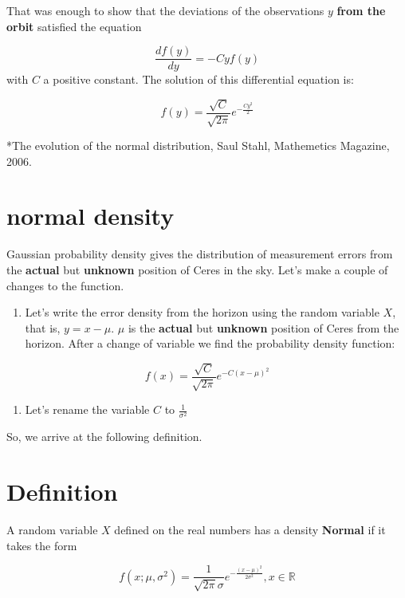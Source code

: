 \documentclass[
]{book}
\providecommand{\tightlist}{%
  \setlength{\itemsep}{0pt}\setlength{\parskip}{0pt}}
\begin{document}
That was enough to show that the deviations of the observations \(y\) \textbf{from the orbit} satisfied the equation

\[\frac{df(y)}{dy}=-Cyf(y)\]
with \(C\) a positive constant. The solution of this differential equation is:

\[f(y)=\frac{\sqrt{C}}{\sqrt{2\pi}}e^{-\frac{Cy^2}{2}}\]

*The evolution of the normal distribution, Saul Stahl, Mathemetics Magazine, 2006.

\hypertarget{normal-density}{%
\section{normal density}\label{normal-density}}

Gaussian probability density gives the distribution of measurement errors from the \textbf{actual} but \textbf{unknown} position of Ceres in the sky. Let's make a couple of changes to the function.

\begin{enumerate}
\def\labelenumi{\arabic{enumi})}
\tightlist
\item
  Let's write the error density from the horizon using the random variable \(X\), that is, \(y=x-\mu\). \(\mu\) is the \textbf{actual} but \textbf{unknown} position of Ceres from the horizon. After a change of variable we find the probability density function:
\end{enumerate}

\[f(x)=\frac{\sqrt{C}}{\sqrt{2\pi}}e^{-C(x-\mu)^2}\]

\begin{enumerate}
\def\labelenumi{\arabic{enumi})}
\setcounter{enumi}{1}
\tightlist
\item
  Let's rename the variable \(C\) to \(\frac{1}{\sigma^2}\)
\end{enumerate}

So, we arrive at the following definition.

\hypertarget{definition}{%
\section{Definition}\label{definition}}

A random variable \(X\) defined on the real numbers has a density \textbf{Normal} if it takes the form

\[f(x; \mu, \sigma^2)=\frac{1}{\sqrt{2\pi}\sigma}e^{-\frac{(x-\mu)^2}{2\sigma^2}}, x \in {\mathbb R}\]
\end{document}
